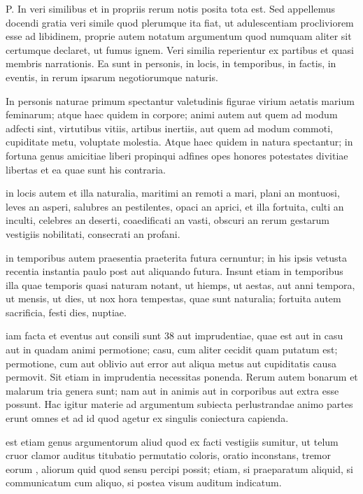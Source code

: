  P. In veri similibus et in propriis rerum notis posita tota est. Sed appellemus docendi gratia veri simile quod plerumque ita fiat, ut adulescentiam procliviorem esse ad libidinem, proprie autem notatum argumentum quod numquam aliter sit certumque declaret, ut fumus ignem. Veri similia reperientur ex partibus et quasi membris narrationis. Ea sunt in personis, in locis, in temporibus, in factis, in eventis, in rerum ipsarum negotiorumque naturis.

 In personis naturae primum spectantur valetudinis figurae virium aetatis marium feminarum; atque haec quidem in corpore; animi autem aut quem ad modum adfecti sint, virtutibus vitiis, artibus inertiis, aut quem ad modum commoti, cupiditate metu, voluptate molestia. Atque haec quidem in natura spectantur; in fortuna genus amicitiae liberi propinqui adfines opes honores potestates divitiae libertas et ea quae sunt his contraria.

 in locis autem et illa naturalia, maritimi an remoti a mari, plani an montuosi, leves an asperi, salubres an pestilentes, opaci an aprici, et illa fortuita, culti an inculti, celebres an deserti, coaedificati an vasti, obscuri an rerum gestarum vestigiis nobilitati, consecrati an profani.

 in temporibus autem praesentia praeterita futura cernuntur; in his ipsis vetusta recentia instantia paulo post aut aliquando futura. Insunt etiam in temporibus illa quae temporis quasi naturam notant, ut hiemps, ut aestas, aut anni tempora, ut mensis, ut dies, ut nox hora tempestas, quae sunt naturalia; fortuita autem sacrificia, festi dies, nuptiae.

 iam facta et eventus aut consili sunt 38 aut imprudentiae, quae est aut in casu aut in quadam animi permotione; casu, cum aliter cecidit quam putatum est; permotione, cum aut oblivio aut error aut aliqua metus aut cupiditatis causa permovit. Sit etiam in imprudentia necessitas ponenda. Rerum autem bonarum et malarum tria genera sunt; nam aut in animis aut in corporibus aut extra esse possunt. Hac igitur materie ad argumentum subiecta perlustrandae animo partes erunt omnes et ad id quod agetur ex singulis coniectura capienda.

 est etiam genus argumentorum aliud quod ex facti vestigiis sumitur, ut telum cruor clamor auditus titubatio permutatio coloris, oratio inconstans, tremor eorum , aliorum quid quod sensu percipi possit; etiam, si praeparatum aliquid, si communicatum cum aliquo, si postea visum auditum indicatum.


